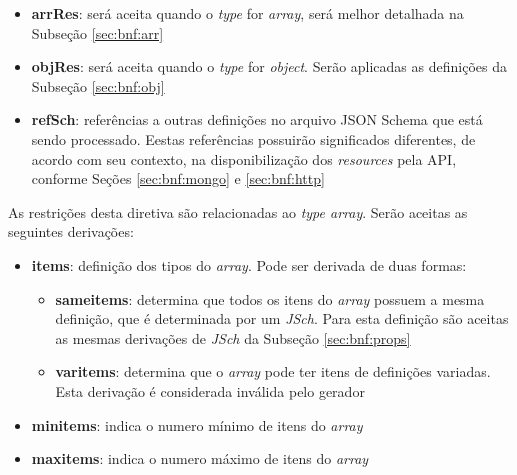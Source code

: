 \begin{itemize}
    \item \textbf{arrRes}: será aceita quando o \textit{type} for \textit{array}, será melhor detalhada na Subseção \ref{sec:bnf:arr}

    \item \textbf{objRes}: será aceita quando o \textit{type} for \textit{object}. Serão aplicadas as definições da Subseção \ref{sec:bnf:obj}

    \item \textbf{refSch}: referências a outras definições no arquivo JSON Schema que está sendo processado. Eestas referências possuirão significados diferentes, de acordo com seu contexto, na disponibilização dos \textit{resources} pela API, conforme Seções \ref{sec:bnf:mongo} e \ref{sec:bnf:http}
\end{itemize}


\label{sec:bnf:arr}
As restrições desta diretiva são relacionadas ao \textit{type array}. Serão aceitas as seguintes derivações:
\begin{itemize}
    \item \textbf{items}: definição dos tipos do \textit{array}. Pode ser derivada de duas formas:
    \begin{itemize}
        \item \textbf{sameitems}: determina que todos os itens do \textit{array} possuem a mesma definição, que é determinada por um \textit{JSch}. Para esta definição são aceitas as mesmas derivações de \textit{JSch} da Subseção \ref{sec:bnf:props}

        \item \textbf{varitems}: determina que o \textit{array} pode ter itens de definições variadas. Esta derivação é considerada inválida pelo gerador

    \end{itemize}


    \item \textbf{minitems}: indica o numero mínimo de itens do \textit{array}

    \item \textbf{maxitems}: indica o numero máximo de itens do \textit{array}
\end{itemize}

